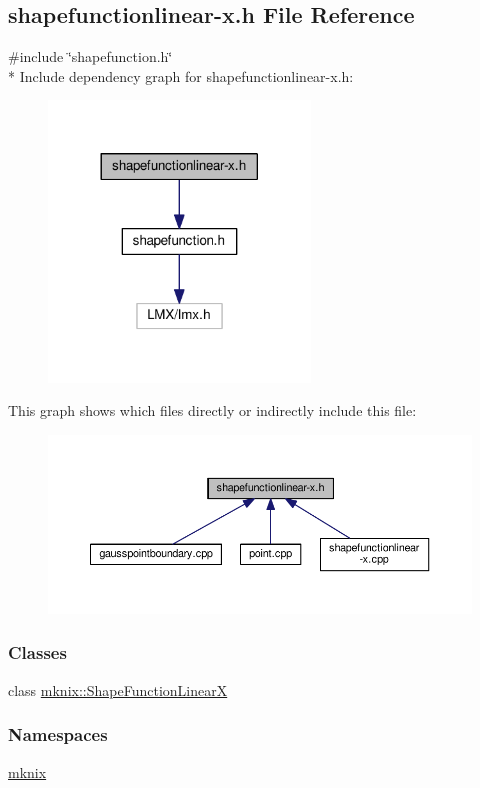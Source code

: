 \hypertarget{shapefunctionlinear-x_8h}{}\subsection{shapefunctionlinear-\/x.h File Reference}
\label{shapefunctionlinear-x_8h}
{\ttfamily \#include \char`\"{}shapefunction.\+h\char`\"{}}\\*
Include dependency graph for shapefunctionlinear-\/x.h\+:\nopagebreak
\begin{figure}[H]
\begin{center}
\leavevmode
\includegraphics[width=197pt]{dc/d8b/shapefunctionlinear-x_8h__incl}
\end{center}
\end{figure}
This graph shows which files directly or indirectly include this file\+:\nopagebreak
\begin{figure}[H]
\begin{center}
\leavevmode
\includegraphics[width=350pt]{d7/da0/shapefunctionlinear-x_8h__dep__incl}
\end{center}
\end{figure}
\subsubsection*{Classes}
\begin{DoxyCompactItemize}
\item 
class \hyperlink{classmknix_1_1_shape_function_linear_x}{mknix\+::\+Shape\+Function\+Linear\+X}
\end{DoxyCompactItemize}
\subsubsection*{Namespaces}
\begin{DoxyCompactItemize}
\item 
 \hyperlink{namespacemknix}{mknix}
\end{DoxyCompactItemize}
